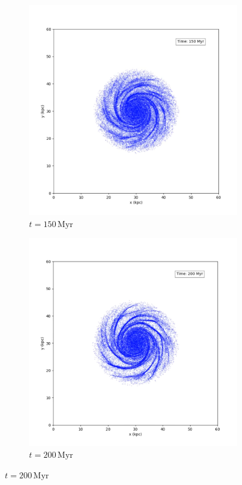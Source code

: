 \begin{figure}[htp]
    \vspace{0.5cm}

    \begin{subfigure}[b]{0.45\textwidth}
        \centering
        \includegraphics[width=\textwidth]{img/pm/150myr.png}
        \caption{$t=150\,\text{Myr}$}
        \label{fig:spiral-galaxy-evolution-pm-sub3}
    \end{subfigure}
    \hfill
    \begin{subfigure}[b]{0.45\textwidth}
        \centering
        \includegraphics[width=\textwidth]{img/pm/200myr.png}
        \caption{$t=200\,\text{Myr}$}
        \label{fig:spiral-galaxy-evolution-pm-sub4}
    \end{subfigure}


\end{figure}
